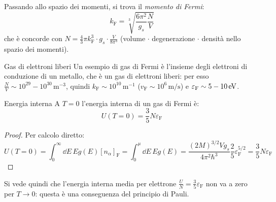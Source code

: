 Passando allo spazio dei momenti, si trova il \textit{momento di Fermi}:
\begin{equation}
	k_\text{F} = \sqrt[3]{\frac{6\pi^2}{g_s} \frac{N}{V}}
	\label{eq:k-f}
\end{equation}
che è concorde con $ N = \frac{4}{3} \pi k_\text{F}^3 \cdot g_s \cdot \frac{V}{8\pi^3} $ (volume $ \cdot $ degenerazione $ \cdot $ densità nello spazio dei momenti).

\begin{example}{Gas di elettroni liberi}{}
	Un esempio di gas di Fermi è l'insieme degli elettroni di conduzione di un metallo, che è un gas di elettroni liberi: per esso $ \frac{N}{V} \sim 10^{29}-10^{30} \,\text{m}^{-3} $, quindi $ k_\text{F} \sim 10^{10} \,\text{m}^{-1} $ ($ v_\text{F} \sim 10^6 \,\text{m}/\text{s} $) e $ \varepsilon_\text{F} \sim 5-10 \,\mathrm{eV} $.
\end{example}

\begin{proposition}{Energia interna}{}
	A $ T = 0 $ l'energia interna di un gas di Fermi è:
	\begin{equation}
		U(T = 0) = \frac{3}{5} N \varepsilon_\text{F}
	\end{equation}

	\tcblower

	\begin{proof}
		Per calcolo diretto:
		\begin{equation*}
			U(T = 0) = \int_0^\infty \dd E\, E g(E) [n_\alpha]_\text{F} = \int_0^\mu \dd E\, E g(E) = \frac{(2M)^{3/2} V g_s}{4\pi^2 \hbar^3} \frac{2}{5} \varepsilon_\text{F}^{5/2} = \frac{3}{5} N \varepsilon_\text{F}
		\end{equation*}
	\end{proof}
\end{proposition}

Si vede quindi che l'energia interna media per elettrone $ \frac{U}{N} = \frac{3}{5} \varepsilon_\text{F} $ non va a zero per $ T \rightarrow 0 $: questa è una conseguenza del principio di Pauli.

